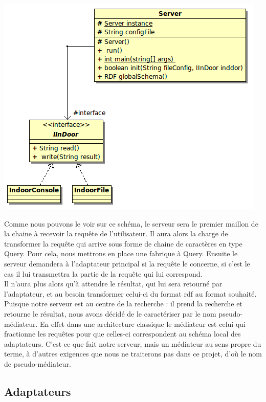 \documentclass[12pt]{article}
\begin{document}
\begin{center}
	\includegraphics[scale=0.70]{images/Serveur.png}
\end{center}

	Comme nous pouvons le voir sur ce schéma, le serveur sera le premier maillon de la chaine à recevoir la requête de l'utilisateur. Il aura alors la charge de transformer la requête qui arrive sous forme de chaine de caractères en type Query. Pour cela, nous mettrons en place une fabrique à Query. Ensuite le serveur demandera à l'adaptateur principal si la requête le concerne, si c'est le cas il lui transmettra la partie de la requête qui lui correspond.\\
	\indent Il n'aura plus alors qu'à attendre le résultat, qui lui sera retourné par l'adaptateur, et au besoin transformer celui-ci du format rdf au format souhaité.\\
	\indent Puisque notre serveur est au centre de la recherche : il prend la recherche et retourne le résultat, nous avons décidé de le caractériser par le nom pseudo-médiateur. En effet dans une architecture classique le médiateur est celui qui fractionne les requêtes pour que celles-ci correspondent au schéma local des adaptateurs. C'est ce que fait notre serveur, mais un médiateur au sens propre du terme, à d'autres exigences que nous ne traiterons pas dans ce projet, d'où le nom de pseudo-médiateur.

\subsection{Adaptateurs}
\end{document}

